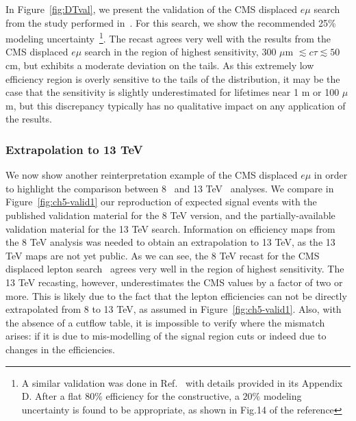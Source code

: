 In Figure~\ref{fig:DTval}, we present the validation of the CMS displaced $e\mu$
search~\cite{Khachatryan:2014mea} from the study performed
in~\cite{Evans:2016zau}.  For this search, we show the recommended 25\% modeling
uncertainty~\footnote{A similar validation was done in Ref.~\cite{Liu:2015bma} with details 
provided in its Appendix D. After a flat $80\%$ efficiency for the constructive, a $20\%$ modeling uncertainty 
is found to be appropriate, as shown in Fig.14 of the reference}. The recast agrees 
very well with the results from the CMS displaced
$e\mu$ search  in the region of highest sensitivity, 300 $\mu$m $\lesssim c\tau
\lesssim 50$ cm, but exhibits a moderate deviation on the tails.   As this
extremely low efficiency region is overly sensitive to the tails of the
distribution, it may be the case that the sensitivity is slightly underestimated
for lifetimes near 1 m or 100 $\mu$m, but this discrepancy typically has no
qualitative impact on any application of the results.

\subsubsection{Extrapolation to 13 TeV}

We now show another reinterpretation example of the CMS displaced $e\mu$ in
order to highlight the comparison between 8~\cite{Khachatryan:2014mea} and 13
TeV~\cite{CMS-PAS-EXO-16-022} analyses. We compare in
Figure~\ref{fig:ch5-valid1} our reproduction of expected signal events with the
published validation material for the 8 TeV version, and the partially-available
validation material for the 13 TeV search.
Information on efficiency maps from the 8 TeV analysis was needed
to obtain an extrapolation to 13 TeV, as the 13 TeV maps are not yet public.
As we can see, the 8 TeV recast for the CMS displaced lepton
search~\cite{Khachatryan:2014mea} agrees very well in the region of highest
sensitivity. The 13 TeV recasting, however, underestimates the CMS values
by a factor of two or more. This is likely due to the fact that the
lepton efficiencies can not be directly extrapolated from 8 to 13 TeV,
as assumed in Figure~\ref{fig:ch5-valid1}. 
Also, with the absence of a cutflow table, it is impossible to verify where the
mismatch arises: if it is due to mis-modelling of the signal region
cuts or indeed due to changes in the efficiencies.



